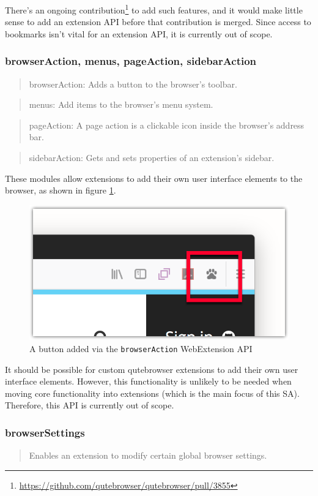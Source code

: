 There's an ongoing
contribution\footnote{\url{https://github.com/qutebrowser/qutebrowser/pull/3855}}
to add such features, and it would make little sense to add an extension API before
that contribution is merged. Since access to bookmarks isn't vital for an extension
API, it is currently out of scope.

\subsubsection{browserAction, menus, pageAction, sidebarAction}
\begin{quote}
browserAction: Adds a button to the browser's toolbar.
\end{quote}
\begin{quote}
menus: Add items to the browser's menu system.
\end{quote}
\begin{quote}
pageAction: A page action is a clickable icon inside the browser's address bar.
\end{quote}
\begin{quote}
sidebarAction: Gets and sets properties of an extension's sidebar.
\end{quote}

These modules allow extensions to add their own user interface elements to the
browser, as shown in figure \ref{img:browser-action}.

\begin{figure}[h]
  \centering
  \includegraphics[width=0.5\linewidth]{img/browser-action.png}
  \caption{A button added via the \texttt{browserAction} WebExtension API}
  \label{img:browser-action}
\end{figure}

It should be possible for custom qutebrowser extensions to add their own user
interface elements. However, this functionality is unlikely to be needed
when moving core functionality into extensions (which is the main focus of this
SA). Therefore, this API is currently out of scope.

\subsubsection{browserSettings}
\begin{quote}
Enables an extension to modify certain global browser settings.
\end{quote}

